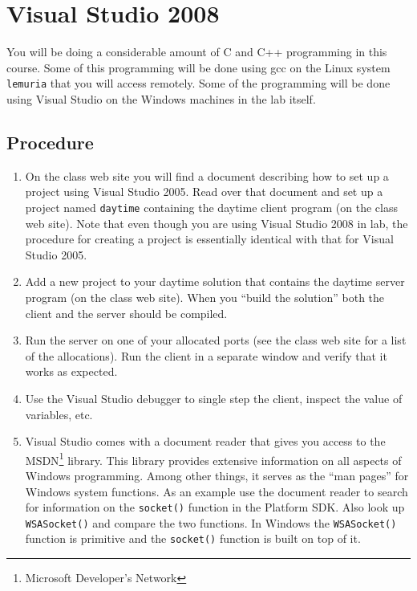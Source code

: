 \documentclass[twocolumn]{article}
\begin{document}
\section{Visual Studio 2008}

You will be doing a considerable amount of C and C++ programming in this course. Some of this
programming will be done using gcc on the Linux system \texttt{lemuria} that you will access
remotely. Some of the programming will be done using Visual Studio on the Windows machines in
the lab itself.

\subsection*{Procedure}

\begin{enumerate}

\item On the class web site you will find a document describing how to set up a project using
  Visual Studio 2005. Read over that document and set up a project named \texttt{daytime}
  containing the daytime client program (on the class web site). Note that even though you are
  using Visual Studio 2008 in lab, the procedure for creating a project is essentially identical
  with that for Visual Studio 2005.

\item Add a new project to your daytime solution that contains the daytime server program (on
  the class web site). When you ``build the solution'' both the client and the server should be
  compiled.

\item Run the server on one of your allocated ports (see the class web site for a list of the
  allocations). Run the client in a separate window and verify that it works as expected.

\item Use the Visual Studio debugger to single step the client, inspect the value of variables,
  etc.

\item Visual Studio comes with a document reader that gives you access to the
  MSDN\footnote{Microsoft Developer's Network} library. This library provides extensive
  information on all aspects of Windows programming. Among other things, it serves as the ``man
  pages'' for Windows system functions. As an example use the document reader to search for
  information on the \texttt{socket()} function in the Platform SDK. Also look up
  \texttt{WSASocket()} and compare the two functions. In Windows the \texttt{WSASocket()}
  function is primitive and the \texttt{socket()} function is built on top of it.

\end{enumerate}
\end{document}
